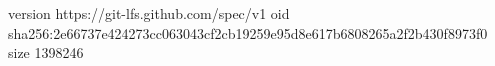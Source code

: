 version https://git-lfs.github.com/spec/v1
oid sha256:2e66737e424273cc063043cf2cb19259e95d8e617b6808265a2f2b430f8973f0
size 1398246
